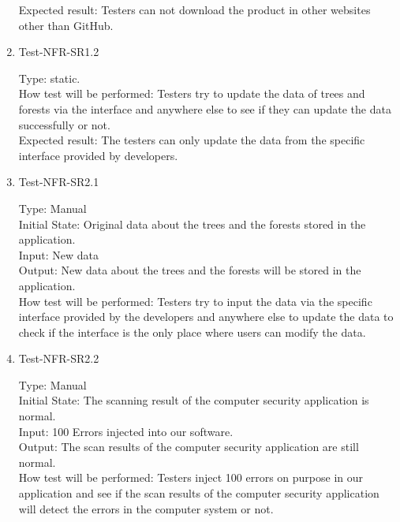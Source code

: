 \documentclass[12pt, titlepage]{article}
\begin{document}
\begin{enumerate}
Expected result: Testers can not download the product in other websites other than GitHub.

\item{Test-NFR-SR1.2\\}

Type: static.\\

How test will be performed: Testers try to update the data of trees and forests via the interface and anywhere else to see if they can update the data successfully or not.\\

Expected result: The testers can only update the data from the specific interface provided by developers.

\item{Test-NFR-SR2.1\\}

Type: Manual\\

Initial State: Original data about the trees and the forests stored in the application.\\

Input:  New data\\

Output: New data about the trees and the forests will be stored in the application.\\

How test will be performed: Testers try to input the data via the specific interface provided by the developers and anywhere else to update the data to check if the interface is the only place where users can modify the data.

\item{Test-NFR-SR2.2\\}

Type: Manual\\

Initial State: The scanning result of the computer security application is normal. \\

Input: 100 Errors injected into our software.\\

Output: The scan results of the computer security application are still normal.\\

How test will be performed: Testers inject 100 errors on purpose in our application and see if the scan results of the computer security application will detect the errors in the computer system or not.


\end{enumerate}
\end{document}
